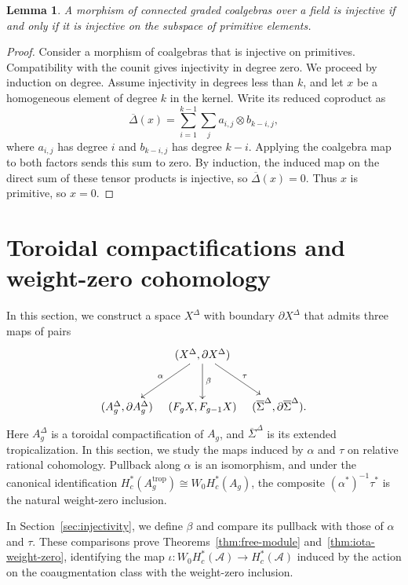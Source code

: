 \documentclass[12 pt]{amsart}
\newcommand{\cA}{\mathcal{A}}
\newcommand{\trop}{\mathrm{trop}}
\newcommand{\<}{\langle}
\renewcommand{\>}{\rangle}
\newtheorem{lemma}[theorem]{Lemma}
\theoremstyle{definition}
\begin{document}
\begin{lemma}\label{lem:coalgebra-injectivity}
A morphism of connected graded coalgebras over a field is injective if and only if it is injective on the subspace of primitive elements.
\end{lemma}

\begin{proof}
Consider a morphism of coalgebras that is injective on primitives. Compatibility with the counit gives injectivity in degree zero. We proceed by induction on degree. Assume injectivity in degrees less than $k$, and let $x$ be a homogeneous element of degree $k$ in the kernel. Write its reduced coproduct as
\[
\overline{\Delta}(x) = \sum_{i = 1}^{k - 1} \sum_j a_{i, j} \otimes b_{k - i, j},
\]
where $a_{i, j}$ has degree $i$ and $b_{k - i, j}$ has degree $k - i$. Applying the coalgebra map to both factors sends this sum to zero. By induction, the induced map on the direct sum of these tensor products is injective, so $\overline{\Delta}(x) = 0$. Thus $x$ is primitive, so $x = 0$.
\end{proof}


\section{Toroidal compactifications and weight-zero cohomology}\label{sec:toroidal-resolution}

In this section, we construct a space $X^\Delta$ with boundary $\partial X^\Delta$ that admits three maps of pairs
\begin{equation}\label{eq:XDelta-maps}
\xymatrix@C=8pt@R=28pt{
& (X^\Delta, \partial X^\Delta) \ar[dl]_{\alpha} \ar[d]^{\beta} \ar[dr]^{\tau} & \\
(A_g^\Delta, \partial A_g^\Delta) & (F_g X, F_{g - 1} X) & (\overline \Sigma^\Delta, \partial \overline \Sigma^\Delta).
}
\end{equation}
Here $A_g^\Delta$ is a toroidal compactification of $A_g$, and $\overline \Sigma^\Delta$ is its extended tropicalization. In this section, we study the maps induced by $\alpha$ and $\tau$ on relative rational cohomology. Pullback along $\alpha$ is an isomorphism, and under the canonical identification $H_c^*(A_g^\trop) \cong W_0 H_c^*(A_g)$, the composite $(\alpha^*)^{-1}\tau^*$ is the natural weight-zero inclusion.

In Section~\ref{sec:injectivity}, we define $\beta$ and compare its pullback with those of $\alpha$ and $\tau$. These comparisons prove Theorems~\ref{thm:free-module} and~\ref{thm:iota-weight-zero}, identifying the map $\iota \colon W_0 H_c^*(\cA) \to H_c^*(\cA)$ induced by the action on the coaugmentation class with the weight-zero inclusion.
\end{document}
